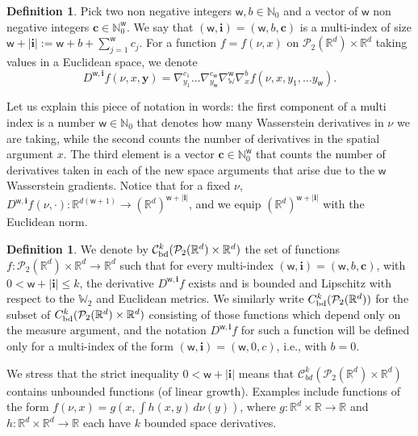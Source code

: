 \documentclass[11pt,reqno]{amsart}
\numberwithin{equation}{section}
\theoremstyle{definition}
\newtheorem{definition}[theorem]{Definition}
\def\R{{\mathbb R}}
\def\N{{\mathbb N}}
\newcommand{\wgrad}{\nabla_{\W}}
\newcommand{\W}{\mathbb W}
\begin{document}
\begin{definition} \label{def:multiindex}
Pick two non negative integers $\mathsf{w},b\in \N_0$ and a vector of $\mathsf{w}$ non negative integers $\boldsymbol{c}\in \N_0^{\mathsf w}$. We say that $(\mathsf{w},\boldsymbol{i})=(\mathsf{w},b,\boldsymbol{c})$ is a multi-index of size $\mathsf{w}+|\boldsymbol{i}|:=\mathsf{w}+b+\sum_{j=1}^\mathsf{w} c_j$. For a function $f=f(\nu,x)$ on $\mathcal P_2(\R^d)\times \R^d$ taking values in a Euclidean space, we denote
    \begin{equation*} D^{\mathsf{w},\boldsymbol{i}}f(\nu,x,\boldsymbol{y})=\nabla_{y_1}^{c_1}\dots \nabla_{y_{\mathsf{w}}}^{c_{\mathsf{w}}}\wgrad^{\mathsf{w}}\nabla_x^b f(\nu,x,y_1,\dots y_\mathsf{w}).
    \end{equation*}
\end{definition}
Let us explain this piece of notation in words: the first component of a multi index is a number $\mathsf{w} \in \N_0$ that denotes how many Wasserstein derivatives in $\nu$ we are taking, while the second counts the number of derivatives in the spatial argument $x$. The third element is a vector $\boldsymbol{c}\in \N^\mathsf{w}_0$ that counts the number of derivatives taken in each of the new space arguments that arise due to the $\mathsf w$ Wasserstein gradients. Notice that for a fixed $\nu$, $D^{\mathsf{w},\boldsymbol i}f(\nu,\cdot):\R^{d(\mathsf{w}+1)}\to (\R^{d})^{\mathsf{w}+|\boldsymbol i|}$, and we equip $(\R^{d})^{\mathsf{w}+|\boldsymbol i|}$ with the Euclidean norm.

\begin{definition}
We denote by $\mathcal C^k_{\textup{bd}}(\mathcal P_2(\R^d)\times \R^d)$ the set of functions $f:\mathcal P_2(\R^d)\times \R^d\to \R^d$ such that for every multi-index $(\mathsf w,\boldsymbol{i})=(\mathsf w, b,\boldsymbol c)$, with $0<\mathsf w+|\boldsymbol{i}|\leq k$, the derivative $D^{\boldsymbol{\mathsf w,i}}f$ exists and is bounded and Lipschitz with respect to the $\W_2$ and Euclidean metrics. We similarly write $C^k_{\textup{bd}}(\mathcal P_2(\R^d) )$ for the subset of $C^k_{\textup{bd}}(\mathcal P_2(\R^d)\times \R^d)$ consisting of those functions which depend only on the measure argument, and the notation $D^{\mathsf w,\boldsymbol{i}}f$ for such a function will be defined only for a multi-index of the form $(\mathsf{w},\boldsymbol{i})=(\mathsf{w},0,c)$, i.e., with $b=0$.
\end{definition}
We stress that the strict inequality $0 < \mathsf w+|\boldsymbol{i}|$ means that $\mathcal C^k_{bd}(\mathcal P_2(\R^d)\times \R^d)$ contains unbounded functions (of linear growth). 
Examples include functions of the form $f(\nu,x)=g(x,\int h(x,y)\,d\nu(y))$, where $g:\R^d\times \R \to \R$ and $h:\R^d \times \R^d \to \R$ each have $k$ bounded space derivatives.
\end{document}
